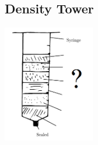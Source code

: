 \pagebreak


\subsection{Density Tower}

\begin{center}
\includegraphics[width=0.3\textwidth]{./img/density-tower-sci-meth.png}
\end{center}

